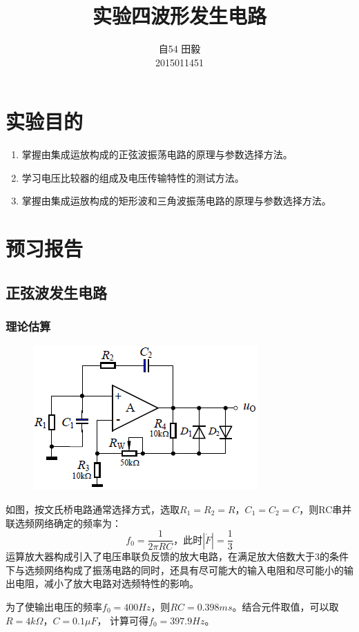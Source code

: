 \documentclass[12pt,a4paper]{article}
\title{实验四\quad 波形发生电路}
\author{自54 田毅\\ 2015011451}
\begin{document}
\begin{spacing}{1.3}
\maketitle
\tableofcontents
\newpage
\section{实验目的}
\begin{enumerate}
\item 掌握由集成运放构成的正弦波振荡电路的原理与参数选择方法。
\item 学习电压比较器的组成及电压传输特性的测试方法。
\item 掌握由集成运放构成的矩形波和三角波振荡电路的原理与参数选择方法。
\end{enumerate}
\section{预习报告}
\subsection{正弦波发生电路}
\subsubsection{理论估算}
\begin{figure}[H]
\centering
\includegraphics{1.jpg}
\end{figure}
如图，按文氏桥电路通常选择方式，选取$R_1=R_2=R，C_1=C_2=C$，则RC串并联选频网络确定的频率为： 
\[f_0=\frac{1}{2\pi RC}，此时|\dot{F}|=\frac{1}{3}\]
运算放大器构成引入了电压串联负反馈的放大电路，在满足放大倍数大于3的条件下与选频网络构成了振荡电路的同时，还具有尽可能大的输入电阻和尽可能小的输出电阻，减小了放大电路对选频特性的影响。\par
为了使输出电压的频率$f_0=400Hz$，则$RC= 0.398ms。$结合元件取值，可以取$R=4k\Omega ，C=0.1\mu F$，
计算可得$f_0=397.9Hz$。

\end{spacing}
\end{document}
